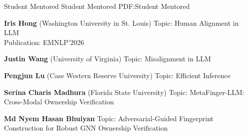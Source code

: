 
\Section
{Student Mentored}
{Student Mentored}
{PDF:Student Mentored}

\BulletItem
\textbf{Iris Hong} (Washington University in St. Louis)
\newline
Topic: Human Alignment in LLM\\
Publication: EMNLP'2026

\BulletItem
\textbf{Justin Wang} (University of Virginia)
\newline
Topic: Misalignment in LLM

\BulletItem
\textbf{Pengjun Lu} (Case Western Reserve University)
\newline
Topic: Efficient Inference

\Gap
\BulletItem
\textbf{Serina Charis Madhura} (Florida State University)
\newline
Topic: MetaFinger-LLM: Cross-Modal Ownership Verification

\Gap
\BulletItem
\textbf{Md Nyem Hasan Bhuiyan}
\newline
Topic: Adversarial-Guided Fingerprint Construction for Robust GNN Ownership Verification
